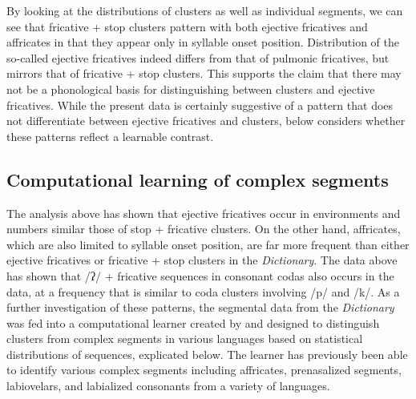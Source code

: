 \documentclass[output=paper,colorlinks,citecolor=brown]{langscibook}
\begin{document}
By looking at the distributions of clusters as well as individual segments, we can see that fricative + stop clusters pattern with both ejective fricatives and affricates in that they appear only in syllable onset position. Distribution of the so-called ejective fricatives indeed differs from that of pulmonic fricatives, but mirrors that of fricative + stop clusters. This supports the claim that there may not be a phonological basis for distinguishing between clusters and ejective fricatives. While the present data is certainly suggestive of a pattern that does not differentiate between ejective fricatives and clusters,  below considers whether these patterns reflect a learnable contrast.

\subsection{Computational learning of complex segments}\label{subsection:compLearn}
The analysis above has shown that ejective fricatives occur in environments and numbers similar those of stop + fricative clusters. On the other hand, affricates, which are also limited to syllable onset position, are far more frequent than either ejective fricatives or fricative + stop clusters in the \textit{Dictionary}. The data above has shown that /ʔ/ + fricative sequences in consonant codas also occurs in the data, at a frequency that is similar to coda clusters involving /p/ and /k/. As a further investigation of these patterns, the segmental data from the \textit{Dictionary} was fed into a computational learner created by \citet{Gouskova2021} and designed to distinguish clusters from complex segments in various languages based on statistical distributions of sequences, explicated below. The learner has previously been able to identify various complex segments including affricates, prenasalized segments, labiovelars, and labialized consonants from a variety of languages.
\end{document}
